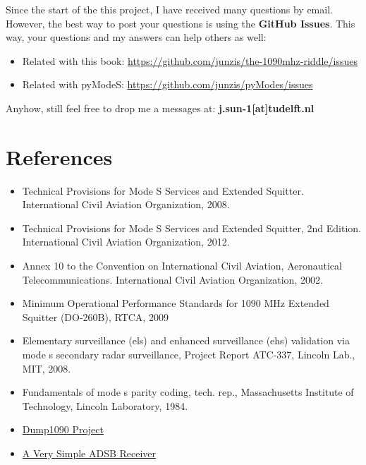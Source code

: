Since the start of the this project, I have received many questions by
email. However, the best way to post your questions is using the
\textbf{GitHub Issues}. This way, your questions and my answers can help
others as well:

\begin{itemize}
\item
  Related with this book:
  \url{https://github.com/junzis/the-1090mhz-riddle/issues}
\item
  Related with pyModeS: \url{https://github.com/junzis/pyModes/issues}
\end{itemize}

Anyhow, still feel free to drop me a messages at:
\textbf{j.sun-1{[}at{]}tudelft.nl}

\section{References}\label{references}

\begin{itemize}
\item
  Technical Provisions for Mode S Services and Extended Squitter.
  International Civil Aviation Organization, 2008.
\item
  Technical Provisions for Mode S Services and Extended Squitter, 2nd
  Edition. International Civil Aviation Organization, 2012.
\item
  Annex 10 to the Convention on International Civil Aviation,
  Aeronautical Telecommunications. International Civil Aviation
  Organization, 2002.
\item
  Minimum Operational Performance Standards for 1090 MHz Extended
  Squitter (DO-260B), RTCA, 2009
\item
  Elementary surveillance (els) and enhanced surveillance (ehs)
  validation via mode s secondary radar surveillance, Project Report
  ATC-337, Lincoln Lab., MIT, 2008.
\item
  Fundamentals of mode s parity coding, tech. rep., Massachusetts
  Institute of Technology, Lincoln Laboratory, 1984.
\item
  \href{https://github.com/antirez/dump1090}{Dump1090 Project}
\item
  \href{http://www.lll.lu/~edward/edward/adsb/VerySimpleADSBreceiver.html}{A
  Very Simple ADSB Receiver}
\end{itemize}
